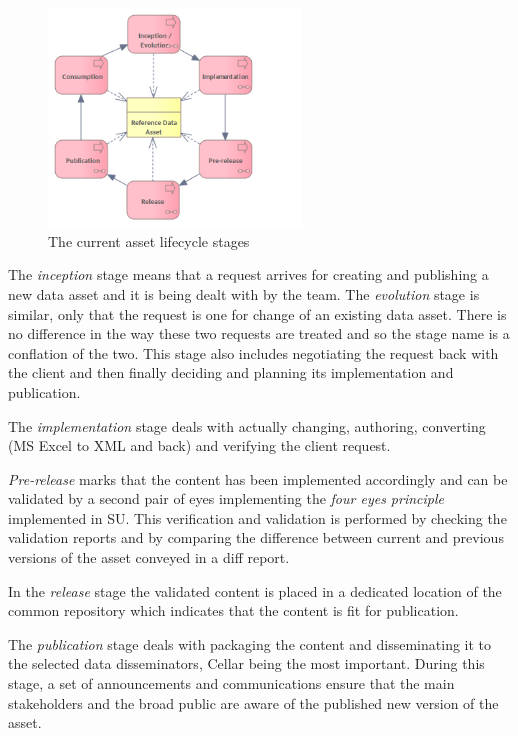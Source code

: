 	\begin{figure}[h]
		\centering
		\includegraphics[width=0.6\textwidth]{images/business/Lifecycle process only (current).png}
		\caption{The current asset lifecycle stages}
		\label{fig:lifecycle-current-stages}
	\end{figure} 

	The \textit{inception} stage means that a request arrives for creating and publishing a new data asset and it is being dealt with by the team. The \textit{evolution} stage is similar, only that the request is one for change of an existing data asset. There is no difference in the way these two requests are treated and so the stage name is a conflation of the two. This stage also includes negotiating the request back with the client and then finally deciding and planning its implementation and publication. 
	
	The \textit{implementation} stage deals with actually changing, authoring, converting (MS Excel to XML and back) and verifying the client request. 
	
	\textit{Pre-release} marks that the content has been implemented accordingly and can be validated by a second pair of eyes implementing the \textit{four eyes principle} implemented in SU. This verification and validation is performed by checking the validation reports and by comparing the difference between current and previous versions of the asset conveyed in a diff report. 
	
	In the \textit{release} stage the validated content is placed in a dedicated location of the common repository which indicates that the content is fit for publication. 
	
	The \textit{publication} stage deals with packaging the content and disseminating it to the selected data disseminators, Cellar being the most important. During this stage, a set of announcements and communications ensure that the main stakeholders and the broad public are aware of the published new version of the asset. 
	
